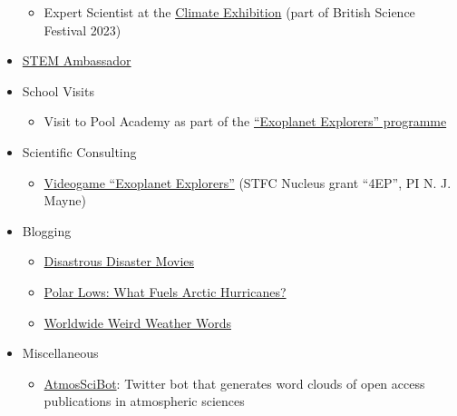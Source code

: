 \documentclass[a4paper, 11pt]{article}
\begin{document}
\begin{itemize}[nosep, leftmargin=10pt]
\begin{itemize}
        \item Expert Scientist at the \href{https://exetersciencecentre.org/exhibition-2023}{Climate Exhibition} (part of British Science Festival 2023)
    \end{itemize}
    \item \href{https://www.stem.org.uk/stem-ambassadors}{STEM Ambassador}
    \item School Visits
    \begin{itemize}
        \item Visit to Pool Academy as part of the \href{https://physics-astronomy.exeter.ac.uk/exoplanetexplorers/}{``Exoplanet Explorers'' programme}
    \end{itemize}
    \item Scientific Consulting
    \begin{itemize}
        \item \href{https://www.wethecurious.org/curious-stuff/stargazing-night-sky/exoplanet-explorers}{Videogame ``Exoplanet Explorers''} (STFC Nucleus grant ``4EP'', PI N. J. Mayne)
    \end{itemize}
    \item Blogging
    \begin{itemize}
        \item \href{http://www.scisnack.com/2015/12/17/disastrous-disaster-movies}{Disastrous Disaster Movies}
        \item \href{http://www.scisnack.com/2015/03/04/polar-lows-what-fuels-arctic-hurricanes}{Polar Lows: What Fuels Arctic Hurricanes?}
        \item \href{http://www.scisnack.com/2014/12/17/worldwide-weird-weather-words}{Worldwide Weird Weather Words}
    \end{itemize}
    \item Miscellaneous
    \begin{itemize}
        \item \href{https://twitter.com/atmosscibot}{AtmosSciBot}: Twitter bot that generates word clouds of open access publications in atmospheric sciences
    \end{itemize}
\end{itemize}

\end{document}
